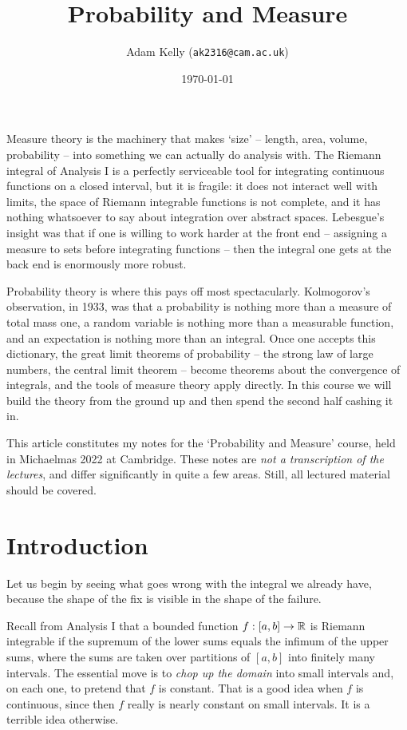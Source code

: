 \documentclass[a4paper]{scrartcl}
\title{Probability and Measure}
\author{Adam Kelly (\texttt{ak2316@cam.ac.uk})}
\date{\today}
\begin{document}
\maketitle

Measure theory is the machinery that makes `size' -- length, area, volume, probability -- into something we can actually do analysis with. The Riemann integral of Analysis I is a perfectly serviceable tool for integrating continuous functions on a closed interval, but it is fragile: it does not interact well with limits, the space of Riemann integrable functions is not complete, and it has nothing whatsoever to say about integration over abstract spaces. Lebesgue's insight was that if one is willing to work harder at the front end -- assigning a measure to sets before integrating functions -- then the integral one gets at the back end is enormously more robust.

Probability theory is where this pays off most spectacularly. Kolmogorov's observation, in 1933, was that a probability is nothing more than a measure of total mass one, a random variable is nothing more than a measurable function, and an expectation is nothing more than an integral. Once one accepts this dictionary, the great limit theorems of probability -- the strong law of large numbers, the central limit theorem -- become theorems about the convergence of integrals, and the tools of measure theory apply directly. In this course we will build the theory from the ground up and then spend the second half cashing it in.

This article constitutes my notes for the `Probability and Measure' course, held in Michaelmas 2022 at Cambridge. These notes are \emph{not a transcription of the lectures}, and differ significantly in quite a few areas. Still, all lectured material should be covered.

\tableofcontents

\section{Introduction}

Let us begin by seeing what goes wrong with the integral we already have, because the shape of the fix is visible in the shape of the failure.

Recall from Analysis I that a bounded function $f : [a,b] \to \mathbb{R}$ is Riemann integrable if the supremum of the lower sums equals the infimum of the upper sums, where the sums are taken over partitions of $[a,b]$ into finitely many intervals. The essential move is to \emph{chop up the domain} into small intervals and, on each one, to pretend that $f$ is constant. That is a good idea when $f$ is continuous, since then $f$ really is nearly constant on small intervals. It is a terrible idea otherwise.
\end{document}
